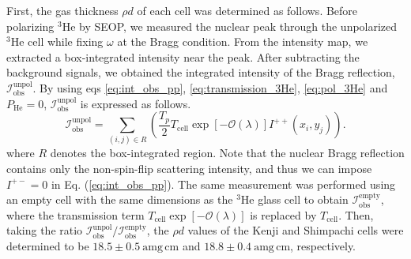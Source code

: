 \documentclass[%
 reprint,
superscriptaddress,
 amsmath,amssymb,
 aps,
floatfix,
]{revtex4-2}
\newcommand{\He}{$^3$He }
\begin{document}
    First, the gas thickness $\rho d$ of each cell was determined as follows. 
    Before polarizing \He by SEOP, we measured the nuclear peak through the unpolarized \He cell while fixing $\omega$ at the Bragg condition.
    From the intensity map, we extracted a box-integrated intensity near the peak.
    After subtracting the background signals, we obtained the integrated intensity of the Bragg reflection, $\mathcal{I}_\mathrm{obs}^\mathrm{unpol}$.
    By using eqs \ref{eq:int_obs_pp}, \ref{eq:transmission_3He}, \ref{eq:pol_3He} and $P_\mathrm{He}=0$, $\mathcal{I}_\mathrm{obs}^\mathrm{unpol}$ is expressed as follows.
    \begin{equation}
        \mathcal{I}^\mathrm{unpol}_\mathrm{obs}
        =\sum_{(i,j)\in R}
        \left(
        \frac{T_p}{2}
        T_\mathrm{cell}
        \exp[-\mathcal{O}(\lambda)]
        I^{++}(x_i,y_j)
        \right).
    \end{equation}
    where $R$ denotes the box-integrated region.
    Note that the nuclear Bragg reflection contains only the non-spin-flip scattering intensity, and thus we can impose $I^{+-} = 0$ in Eq. (\ref{eq:int_obs_pp}).
    The same measurement was performed using an empty cell with the same dimensions as the \He glass cell to obtain $\mathcal{I}^\mathrm{empty}_\mathrm{obs}$, where the transmission term $T_\mathrm{cell}\exp[-\mathcal{O}(\lambda)]$ is replaced by $T_\mathrm{cell}$.
    Then, taking the ratio $\mathcal{I}^\mathrm{unpol}_\mathrm{obs}/\mathcal{I}^\mathrm{empty}_\mathrm{obs}$,  the $\rho d$ values of the Kenji and Shimpachi cells were determined to be $18.5 \pm 0.5~\mathrm{amg\,cm}$ and $18.8 \pm 0.4~\mathrm{amg\,cm}$, respectively.

\end{document}
